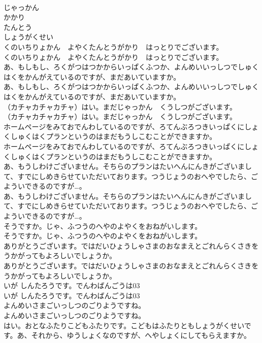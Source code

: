 \documentclass[8pt]{extreport}
\begin{document}
\begin{CJK}{UTF8}{min}
\\	じゃっかん
\\	かかり
\\	たんとう
\\	しょうがくせい
\\	くのいちりょかん　よやくたんとうがかり　はっとりでございます。
\\	くのいちりょかん　よやくたんとうがかり　はっとりでございます。
\\	あ、もしもし、ろくがつはつかからいっぱくふつか、よんめいいっしつでしゅくはくをかんがえているのですが、まだあいていますか。
\\	あ、もしもし、ろくがつはつかからいっぱくふつか、よんめいいっしつでしゅくはくをかんがえているのですが、まだあいていますか。
\\	（カチャカチャカチャ）はい。まだじゃっかん　くうしつがございます。
\\	（カチャカチャカチャ）はい。まだじゃっかん　くうしつがございます。
\\	ホームページをみておでんわしているのですが、ろてんぶろつきいっぱくにしょくしゅくはくプランというのはまだもうしこむことができますか。
\\	ホームページをみておでんわしているのですが、ろてんぶろつきいっぱくにしょくしゅくはくプランというのはまだもうしこむことができますか。
\\	あ、もうしわけございません。そちらのプランはたいへんにんきがございまして、すでにしめきらせていただいております。つうじょうのおへやでしたら、ごよういできるのですが…。
\\	あ、もうしわけございません。そちらのプランはたいへんにんきがございまして、すでにしめきらせていただいております。つうじょうのおへやでしたら、ごよういできるのですが…。
\\	そうですか。じゃ、ふつうのへやのよやくをおねがいします。
\\	そうですか。じゃ、ふつうのへやのよやくをおねがいします。
\\	ありがとうございます。ではだいひょうしゃさまのおなまえとごれんらくさきをうかがってもよろしいでしょうか。
\\	ありがとうございます。ではだいひょうしゃさまのおなまえとごれんらくさきをうかがってもよろしいでしょうか。
\\	いが しんたろうです。でんわばんごうは03
\\	いが しんたろうです。でんわばんごうは03
\\	よんめいさまごいっしつのごりようですね。
\\	よんめいさまごいっしつのごりようですね。
\\	はい。おとなふたりこどもふたりです。こどもはふたりともしょうがくせいです。あ、それから、ゆうしょくなのですが、へやしょくにしてもらえますか。

\end{CJK}
\end{document}
